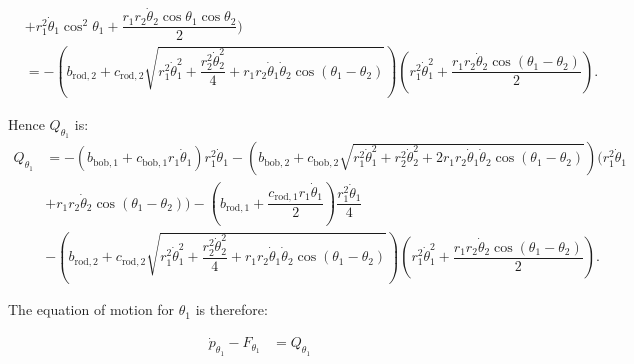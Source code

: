 \documentclass[12pt,a4paper,portrait]{article}
\begin{document}
\begin{align*}
		&+r_1^2 \dot{\theta}_1\cos^2{\theta_1} + \dfrac{r_1r_2 \dot{\theta}_2 \cos{\theta_1}\cos{\theta_2}}{2}) \\
		&= -\left(b_{\mathrm{rod}, 2} + c_{\mathrm{rod}, 2}\sqrt{r_1^2 \dot{\theta}_1^2 + \dfrac{r_2^2 \dot{\theta}_2^2}{4} + r_1 r_2 \dot{\theta}_1 \dot{\theta}_2 \cos{(\theta_1 -\theta_2)}}\right)\left(r_1^2 \dot{\theta}_1^2 + \dfrac{r_1 r_2\dot{\theta}_2 \cos{\left(\theta_1 - \theta_2\right)}}{2}\right).
	\end{align*}
	
	Hence $Q_{\theta_1}$ is:
	\begin{align*}
		Q_{\theta_1} &= -(b_{\mathrm{bob}, 1} + c_{\mathrm{bob}, 1} r_1 \dot{\theta}_1)r_1^2 \dot{\theta}_1 -\left(b_{\mathrm{bob}, 2}+c_{\mathrm{bob}, 2}\sqrt{r_1^2 \dot{\theta}_1^2 + r_2^2 \dot{\theta}_2^2 +2r_1 r_2\dot{\theta}_1 \dot{\theta}_2 \cos{(\theta_1-\theta_2)}}\right)(r_1^2 \dot{\theta}_1 \\
		&+ r_1r_2 \dot{\theta}_2 \cos{(\theta_1-\theta_2)}) -\left(b_{\mathrm{rod}, 1} + \dfrac{c_{\mathrm{rod}, 1}r_1 \dot{\theta}_1}{2}\right) \dfrac{r_1^2 \dot{\theta}_1}{4} \\
		& -\left(b_{\mathrm{rod}, 2} + c_{\mathrm{rod}, 2}\sqrt{r_1^2 \dot{\theta}_1^2 + \dfrac{r_2^2 \dot{\theta}_2^2}{4} + r_1 r_2 \dot{\theta}_1 \dot{\theta}_2 \cos{(\theta_1 -\theta_2)}}\right)\left(r_1^2 \dot{\theta}_1^2 + \dfrac{r_1 r_2\dot{\theta}_2 \cos{\left(\theta_1 - \theta_2\right)}}{2}\right).
	\end{align*}
	
	The equation of motion for $\theta_1$ is therefore:
	
	\begin{align*}
		\dot{p}_{\theta_1} - F_{\theta_1} &= Q_{\theta_1}
	\end{align*}
	
\end{document}
